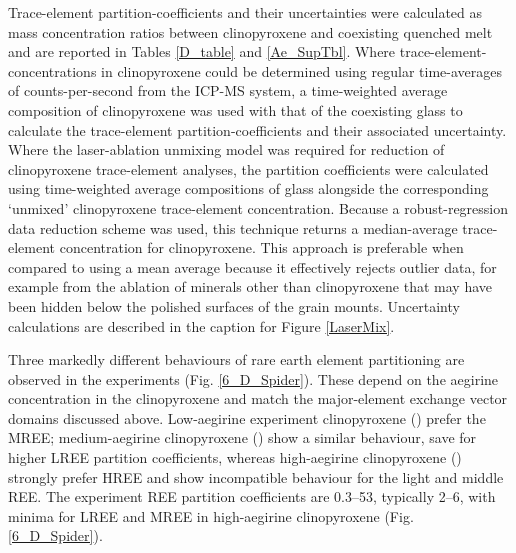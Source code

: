 \documentclass[review,authoryear,12pt]{elsarticle}
\begin{document}
Trace-element partition-coefficients and their uncertainties were calculated as mass concentration ratios between clinopyroxene and coexisting quenched melt and 
 are reported in Tables \ref{D_table} and \ref{Ae_SupTbl}. 
     Where trace-element-concentrations in clinopyroxene could be determined using regular time-averages of counts-per-second from the ICP-MS system, a time-weighted average composition of clinopyroxene was used with that of the coexisting glass to calculate the trace-element partition-coefficients and their associated uncertainty. Where the laser-ablation unmixing model was required for reduction of clinopyroxene trace-element analyses, the partition coefficients were calculated using time-weighted average compositions of glass alongside the corresponding `unmixed' clinopyroxene trace-element concentration. Because a robust-regression data reduction scheme was used, this technique returns a median-average trace-element concentration for clinopyroxene. This approach is preferable when compared to using a mean average because it effectively rejects outlier data, for example from the ablation of minerals other than clinopyroxene that may have been hidden below the polished surfaces of the grain mounts. Uncertainty calculations are described in the caption for Figure \ref{LaserMix}.

 Three markedly different behaviours of rare earth element partitioning are observed in the experiments (Fig. \ref{6_D_Spider}). These depend on the aegirine concentration in the clinopyroxene and match the major-element exchange vector domains discussed above. Low-aegirine experiment clinopyroxene () prefer the MREE; medium-aegirine clinopyroxene () show a similar behaviour, save for higher LREE partition coefficients, whereas high-aegirine clinopyroxene () strongly prefer HREE and show incompatible behaviour for the light and middle REE. The experiment REE partition coefficients are 0.3--53, typically 2--6, with minima for LREE and MREE in high-aegirine clinopyroxene (Fig. \ref{6_D_Spider}). 
\end{document}
